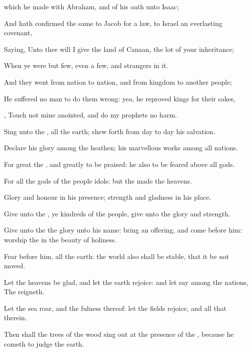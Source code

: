 { which he
made with
Abraham, and of his
oath unto
Isaac;

And hath
confirmed the same to
Jacob for a
law,
{} to
Israel
{} an
everlasting
covenant,

Saying, Unto thee will I
give the
land of
Canaan, the
lot of your
inheritance;

When ye were but
few, even a
few, and
strangers in it.

And
{} they
went from
nation to
nation, and from
{}
kingdom to
another
people;

He
suffered no
man to do them
wrong: yea, he
reproved
kings for their sakes,

,
Touch not mine
anointed, and do my
prophets no
harm.

Sing unto the
{}, all the
earth; shew
forth from
day to
day his
salvation.

Declare his
glory among the
heathen; his marvellous
works among all
nations.

For
great
{} the
{}, and
greatly to be
praised: he also
{} to be
feared above all
gods.

For all the
gods of the
people
{}
idols: but the
{}
made the
heavens.

Glory and
honour
{} in his
presence;
strength and
gladness
{} in his
place.

Give unto the
{}, ye
kindreds of the
people,
give unto the
{}
glory and
strength.

Give unto the
{} the
glory
{} unto his
name:
bring an
offering, and
come
before him:
worship the
{} in the
beauty of
holiness.

Fear
before him, all the
earth: the
world also shall be
stable, that it be not
moved.

Let the
heavens be
glad, and let the
earth
rejoice: and let
{}
say among the
nations, The
{}
reigneth.

Let the
sea
roar, and the
fulness thereof: let the
fields
rejoice, and all that
{} therein.

Then shall the
trees of the
wood sing
out at the
presence of the
{}, because he
cometh to
judge the
earth.

}

